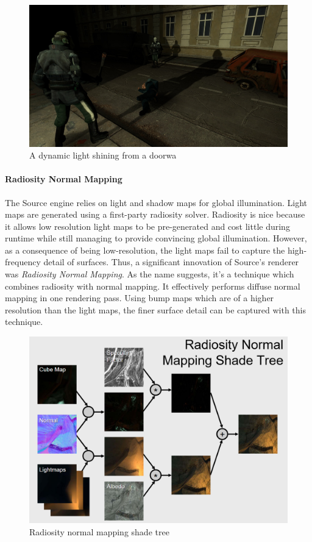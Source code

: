 \documentclass[a4paper, 12pt]{scrartcl}
\begin{document}
\begin{figure}[!htb]
  \centering
  \includegraphics[width=0.66\linewidth]{images/source_env_projectedtexture.jpg}
  \caption{A dynamic light shining from a doorwa}
  \label{fig:source_dynamic_light}
\end{figure}

\paragraph{Radiosity Normal Mapping}
The Source engine relies on light and shadow maps for global illumination. Light maps are generated using a first-party radiosity solver. Radiosity is nice because it allows low resolution light maps to be pre-generated and cost little during runtime while still managing to provide convincing global illumination. However, as a consequence of being low-resolution, the light maps fail to capture the high-frequency detail of surfaces. Thus, a significant innovation of Source's renderer was \textit{Radiosity Normal Mapping}. As the name suggests, it's a technique which combines radiosity with normal mapping. It effectively performs diffuse normal mapping in one rendering pass. Using bump maps which are of a higher resolution than the light maps, the finer surface detail can be captured with this technique.

\begin{figure}[!htb]
  \centering
  \includegraphics[width=0.66\linewidth]{images/source_radiosity_normal_mapping_shade_tree.png}
  \caption{Radiosity normal mapping shade tree}
  \label{fig:source_rad_tree}
\end{figure}
\end{document}
